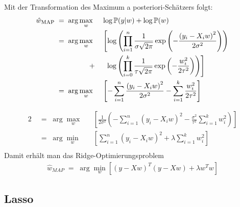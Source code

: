 \documentclass{beamer}
\begin{document}
{\begin{frame}
	Mit der Transformation des Maximum a posteriori-Schätzers folgt:
	\begin{alignat}{2}
		\hat{w}_{\text{MAP}}&\;=\;\arg\underset{w}{\max}&& \log\mathbb{P}(y\vert w) + \log \mathbb{P}(w) \\
		&\;=\;\arg\underset{w}{\max}&&\left[\log\left(\prod_{i=1}^{n}\frac{1}{\sigma\sqrt{2\pi}}\exp\left(-\frac{\left(y_i-X_iw\right)^2}{2\sigma^2}\right)\right)\right.\\	&\hspace{1,7cm}+&&\:\:\left.\log\left(\prod_{i=0}^{k}\frac{1}{\tau\sqrt{2\pi}}\exp\left(-\frac{w_i^2}{2\tau^2}\right)\right)\right]\\
		&\;=\;\arg\underset{w}{\max} && \left[-\sum_{i=1}^{n}\frac{\left(y_i-X_iw\right)^2}{2\sigma^2}-\sum_{i=1}^{k}\frac{w_i^2}{2\tau^2}\right]\\
	\end{alignat}
\end{frame}

\begin{frame}
	\begin{alignat}{2}
		&\;=\;\arg\underset{w}{\max} && \left[\frac{1}{2\sigma^2}\left(-\sum_{i=1}^{n}\left(y_i-X_iw\right)^2-\frac{\sigma^2}{\tau^2}\sum_{i=1}^{k}w_i^2\right)\right]\\
		&\;=\;\arg\underset{w}{\min} && \left[\sum_{i=1}^{n}\left(y_i-X_iw\right)^2+\lambda\sum_{i=1}^{k}w_i^2\right] \\
	\end{alignat}
	Damit erhält man das Ridge-Optimierungsproblem
	\begin{align}
		\hat{w}_{MAP}\;=\;\arg\underset{w}{\min}\left[\left(y-Xw\right)^T\left(y-Xw\right)+\lambda w^Tw\right]
	\end{align}
\end{frame}

\subsection{Lasso}

}
\end{document}
